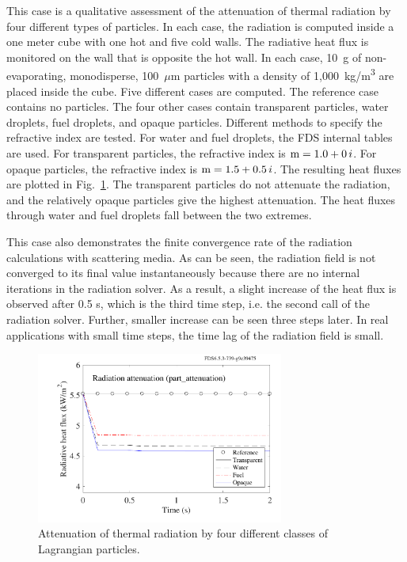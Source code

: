 \documentclass[11pt]{book}
\begin{document}
This case is a qualitative assessment of the attenuation of thermal radiation by four different types of particles. In each case, the radiation is computed inside a one meter cube with one hot and five cold walls. The radiative heat flux is monitored on the wall that is opposite the hot wall. In each case, 10~g of non-evaporating, monodisperse, 100~$\mu$m particles with a density of 1,000~\si{kg/m^3} are placed inside the cube. Five different cases are computed. The reference case contains no particles. The four other cases contain transparent particles, water droplets, fuel droplets, and opaque particles. Different methods to specify the refractive index are tested. For water and fuel droplets, the FDS internal tables are used. For transparent particles, the refractive index is $\hbox{m} = 1.0+0\,i$. For opaque particles, the refractive index is $\hbox{m} = 1.5+0.5 \,i$. The resulting heat fluxes are plotted in Fig.~\ref{part_attenuation_figure}. The transparent particles do not attenuate the radiation, and the relatively opaque particles give the highest attenuation. The heat fluxes through water and fuel droplets fall between the two extremes.

This case also demonstrates the finite convergence rate of the radiation calculations with scattering media. As can be seen, the radiation field is not converged to its final value instantaneously because there are no internal iterations in the radiation solver. As a result, a slight increase of the heat flux is observed after 0.5 s, which is the third time step, i.e. the second call of the radiation solver. Further, smaller increase can be seen three steps later. In real applications with small time steps, the time lag of the radiation field is small.

\begin{figure}[h]
\begin{center}
\includegraphics[width=3.2in]{SCRIPT_FIGURES/part_attenuation}
\end{center}
\caption[Radiation attenuation by Lagrangian particles]{Attenuation of thermal radiation by four different classes of Lagrangian particles.}
\label{part_attenuation_figure}
\end{figure}
\end{document}
